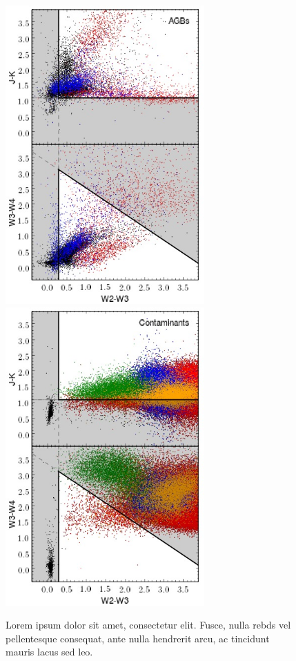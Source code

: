 \begin{figure}
\includegraphics[width=3in]{figs/sampleboundaries.jpg}
\includegraphics[width=3in]{figs/contamboundaries.jpg}
\caption{Lorem ipsum dolor sit amet, consectetur elit. Fusce, nulla rebds vel pellentesque consequat, ante nulla hendrerit arcu, ac tincidunt mauris lacus sed leo.}
\label{fig:boundaries}
\end{figure}

